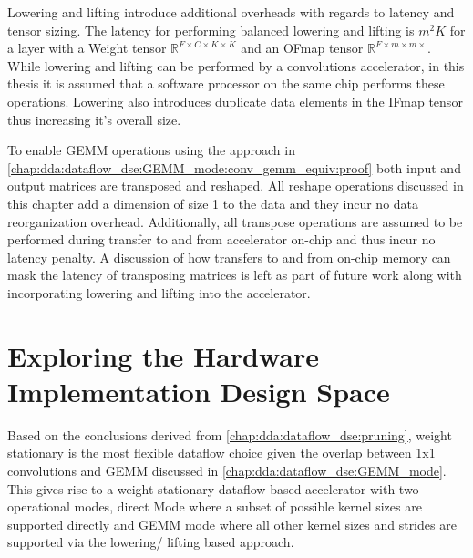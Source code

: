
Lowering and lifting introduce additional overheads with regards to latency and
tensor sizing. The latency for performing balanced lowering and lifting is
$m^{2}K$ for a layer with a Weight tensor $\mathbb{R}^{F\times C\times K\times
K}$ and an OFmap tensor $\mathbb{R}^{F\times m\times m\times}$. While lowering
and lifting can be performed by a convolutions accelerator, in this thesis it is
assumed that a software processor on the same chip performs these operations.
Lowering also introduces duplicate data elements in the IFmap tensor thus
increasing it's overall size. 

To enable GEMM operations using the approach in
\autoref{chap:dda:dataflow_dse:GEMM_mode:conv_gemm_equiv:proof} both input
and output matrices are transposed and reshaped. All reshape operations
discussed in this chapter add a dimension of size 1 to the data and they incur
no data reorganization overhead. Additionally, all transpose operations are
assumed to be performed during transfer to and from accelerator on-chip and thus
incur no latency penalty. A discussion of how transfers to and from on-chip
memory can mask the latency of transposing matrices is left as part of future
work along with incorporating lowering and lifting into the accelerator. 


\section{Exploring the Hardware Implementation Design Space}
\label{chap:dda:hw_dse}

Based on the conclusions derived from \autoref{chap:dda:dataflow_dse:pruning},
weight stationary is the most flexible dataflow choice given the overlap between
1x1 convolutions and GEMM discussed in
\autoref{chap:dda:dataflow_dse:GEMM_mode}. This gives rise to a weight
stationary dataflow based accelerator with two operational modes, direct Mode
where a subset of possible kernel sizes are supported directly and GEMM mode where all
other kernel sizes and strides are supported via the lowering/ lifting based
approach. 

